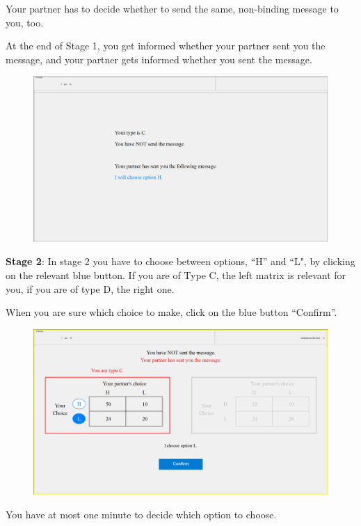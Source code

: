 \documentclass[12pt]{article}
\theoremstyle{break}
\begin{document}
Your partner has to decide whether to send the same, non-binding message to you, too.

At the end of Stage 1, you get informed whether your partner sent you the message, and your partner gets informed whether you sent the message. 

\begin{figure}[h]
  \centering
    \includegraphics[width=.9\textwidth]{fig2-CT-instructions.png}
  \label{fig:fig2-CT-instructions}
\end{figure}


\textbf{Stage 2}: In stage 2 you have to choose between options, ``H'' and ``L", by clicking on the relevant blue button. 
If you are of Type C, the left matrix is relevant for you, if you are of type D, the right one.

When you are sure which choice to make, click on the blue button ``Confirm''.

\begin{figure}[h]
  \centering
    \includegraphics[width=.9\textwidth]{fig3-CT-instructions.png}
  \label{fig:fig3-CT-instructions}
\end{figure}

 
You have at most one minute to decide which option to choose.
\end{document}
